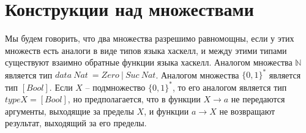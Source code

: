 \section*{Конструкции над множествами}

\def\doubleunderline#1{\underline{\underline{#1}}}

Мы будем говорить, что два множества разрешимо равномощны, если у этих множеств есть аналоги в виде типов 
языка хаскелл, и между этими типами существуют взаимно обратные функции языка хаскелл. Аналогом множества 
$\mathbb{N}$ является тип $data\ Nat\ = Zero\ |\ Suc\ Nat$. Аналогом множества $\{0,1\}^*$ является тип 
$[Bool]$. Если $X$ -- подмножество $\{0,1\}^*$, то его аналогом является тип $type X = [Bool]$, но 
предполагается, что в функции $X \to a$ не передаются аргументы, выходящие за пределы $X$, и функции $a \to 
X$ не возвращают результат, выходящий за его пределы.

